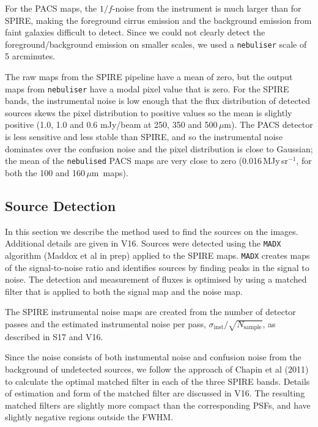 \documentclass[a4paper,fleqn,usenatbib, twocolumn]{aastex61}
\def\mic{\,$\mu $m}
\begin{document}
For the PACS maps, the $1/f$-noise from the instrument is much larger than
for SPIRE, making the foreground cirrus emission and the background
emission from faint galaxies difficult to detect. Since we could not
clearly detect the foreground/background emission on smaller
scales, we used a {\tt nebuliser} scale of 5 arcminutes.

The raw maps from the SPIRE pipeline have a mean of zero, but the
output maps from {\tt nebuliser} have a modal pixel value that is
zero. For the SPIRE bands, the instrumental noise is low enough that
the flux distribution of detected sources skews the pixel distribution
to positive values so the mean is slightly positive (1.0, 1.0 and 0.6
mJy/beam at 250, 350 and 500\mic).  The PACS detector is less
sensitive and less stable than SPIRE, and so the instrumental noise
dominates over the confusion noise and the pixel distribution is close
to Gaussian; the mean of the {\tt nebulised} PACS maps are very close
to zero (0.016\,MJy\,sr$^{-1}$, for both the 100 and 160\mic\ maps).

\subsection{Source Detection} 


In this section we describe the method used to find the
sources on the images. Additional details are given in V16.
Sources were detected using the {\tt MADX} algorithm (Maddox et al in prep)
applied to the SPIRE maps.  {\tt MADX} creates maps of the signal-to-noise
ratio and identifies sources by finding peaks in the signal to noise. The
detection and measurement of fluxes is optimised by using a matched
filter that is applied to both the signal map and the noise map. 

The SPIRE instrumental noise maps are created from the number of
detector passes and the estimated instrumental noise per pass,
$\sigma_{\mathrm{inst}} /\sqrt{N_ {\mathrm{sample}}}$, as described in S17 and V16.

 
Since the noise consists of both instumental noise and
confusion noise from the background of undetected sources, we follow
the approach of Chapin et al (2011) to calculate the optimal matched
filter in each of the three SPIRE bands. Details of estimation and
form of the matched filter are discussed in V16.  The resulting
matched filters are slightly more compact than the corresponding PSFs,
and have slightly negative regions outside the FWHM.  
\end{document}
